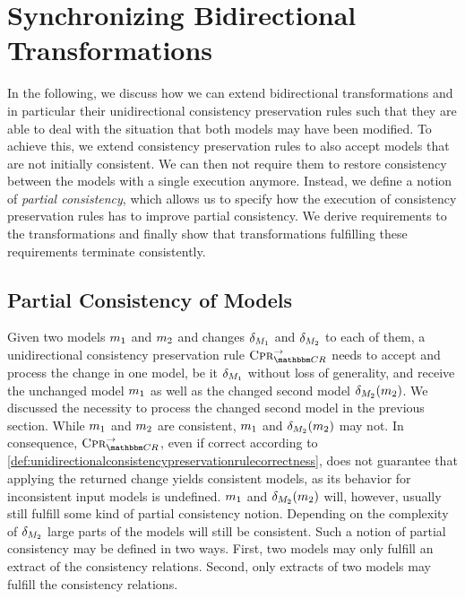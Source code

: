 \section{Synchronizing Bidirectional Transformations}
\label{chap:synchronizing:bidirectional}

In the following, we discuss how we can extend bidirectional transformations and in particular their unidirectional consistency preservation rules such that they are able to deal with the situation that both models may have been modified.
To achieve this, we extend consistency preservation rules to also accept models that are not initially consistent.
We can then not require them to restore consistency between the models with a single execution anymore.
Instead, we define a notion of \emph{partial consistency}, which allows us to specify how the execution of consistency preservation rules has to improve partial consistency.
We derive requirements to the transformations and finally show that transformations fulfilling these requirements terminate consistently.


\subsection{Partial Consistency of Models}
\label{chap:synchronizing:bidirectional:partial}

Given two models $\model{m}{1}$ and $\model{m}{2}$ and changes $\change{\metamodel{M}{1}}$ and $\change{\metamodel{M}{2}}$ to each of them, a unidirectional consistency preservation rule $\consistencypreservationrule{\consistencyrelationset{CR}}^{\rightarrow}$ needs to accept and process the change in one model, be it $\change{\metamodel{M}{1}}$ without loss of generality, and receive the unchanged model $\model{m}{1}$ as well as the changed second model $\change{\metamodel{M}{2}}(\model{m}{2})$.
We discussed the necessity to process the changed second model in the previous section.
While $\model{m}{1}$ and $\model{m}{2}$ are consistent, $\model{m}{1}$ and $\change{\metamodel{M}{2}}(\model{m}{2})$ may not.
In consequence, $\consistencypreservationrule{\consistencyrelationset{CR}}^{\rightarrow}$, even if correct according to \autoref{def:unidirectionalconsistencypreservationrulecorrectness}, does not guarantee that applying the returned change yields consistent models, as its behavior for inconsistent input models is undefined.
$\model{m}{1}$ and $\change{\metamodel{M}{2}}(\model{m}{2})$ will, however, usually still fulfill some kind of partial consistency notion.
Depending on the complexity of $\change{\metamodel{M}{2}}$ large parts of the models will still be consistent. %
%
Such a notion of partial consistency may be defined in two ways.
First, two models may only fulfill an extract of the consistency relations.
Second, only extracts of two models may fulfill the consistency relations.

